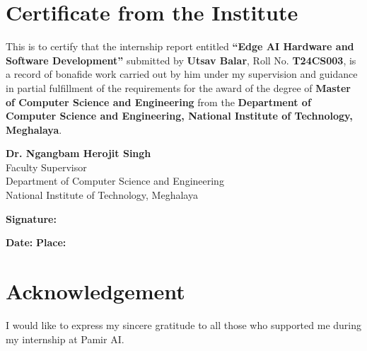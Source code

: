 \documentclass[12pt,a4paper]{report}
\begin{document}
\newpage
\chapter*{Certificate from the Institute}

\vspace{1cm}

This is to certify that the internship report entitled \textbf{``Edge AI Hardware and Software Development''} submitted by \textbf{Utsav Balar}, Roll No. \textbf{T24CS003}, is a record of bonafide work carried out by him under my supervision and guidance in partial fulfillment of the requirements for the award of the degree of \textbf{Master of Computer Science and Engineering} from the \textbf{Department of Computer Science and Engineering, National Institute of Technology, Meghalaya}.

\vspace{2cm}

\noindent
\textbf{Dr. Ngangbam Herojit Singh} \\
Faculty Supervisor \\
Department of Computer Science and Engineering \\
National Institute of Technology, Meghalaya

\vspace{1.5cm}

\noindent
\textbf{Signature:} \underline{\hspace{6cm}}

\vspace{0.5cm}

\noindent
\textbf{Date:} \underline{\hspace{4cm}} \hspace{1cm} \textbf{Place:} \underline{\hspace{4cm}}

\newpage
\chapter*{Acknowledgement}

\vspace{1cm}

I would like to express my sincere gratitude to all those who supported me during my internship at Pamir AI.
\end{document}
